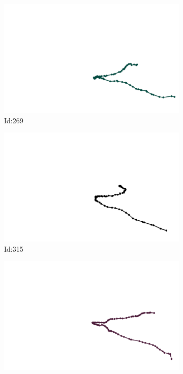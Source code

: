 \documentclass[12pt,twoside]{report}
\begin{document}
\begin{figure}
\centering
\begin{subfigure}[b]{0.20\textwidth}
\centering
\includegraphics[width=\textwidth]{../../trajectories/269.png}
\caption{Id:269}
\end{subfigure}
\begin{subfigure}[b]{0.20\textwidth}
\centering
\includegraphics[width=\textwidth]{../../trajectories/315.png}
\caption{Id:315}
\end{subfigure}
\begin{subfigure}[b]{0.20\textwidth}
\centering
\includegraphics[width=\textwidth]{../../trajectories/501.png}

\end{subfigure}
\end{figure}
\end{document}

